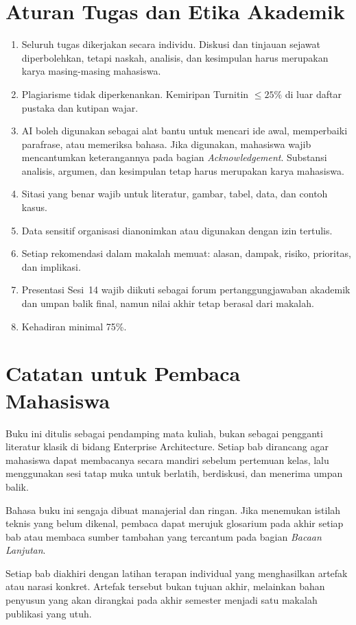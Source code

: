 \section{Aturan Tugas dan Etika Akademik}

\begin{enumerate}
    \item Seluruh tugas dikerjakan secara individu. Diskusi dan tinjauan
    sejawat diperbolehkan, tetapi naskah, analisis, dan kesimpulan harus
    merupakan karya masing-masing mahasiswa.
    \item Plagiarisme tidak diperkenankan. Kemiripan Turnitin $\leq 25\%$ di
    luar daftar pustaka dan kutipan wajar.
    \item AI boleh digunakan sebagai alat bantu untuk mencari ide awal,
    memperbaiki parafrase, atau memeriksa bahasa. Jika digunakan, mahasiswa
    wajib mencantumkan keterangannya pada bagian \emph{Acknowledgement}.
    Substansi analisis, argumen, dan kesimpulan tetap harus merupakan karya
    mahasiswa.
    \item Sitasi yang benar wajib untuk literatur, gambar, tabel, data, dan
    contoh kasus.
    \item Data sensitif organisasi dianonimkan atau digunakan dengan izin
    tertulis.
    \item Setiap rekomendasi dalam makalah memuat: alasan, dampak, risiko,
    prioritas, dan implikasi.
    \item Presentasi Sesi~14 wajib diikuti sebagai forum pertanggungjawaban
    akademik dan umpan balik final, namun nilai akhir tetap berasal dari
    makalah.
    \item Kehadiran minimal 75\%.
\end{enumerate}

\section{Catatan untuk Pembaca Mahasiswa}

Buku ini ditulis sebagai pendamping mata kuliah, bukan sebagai pengganti
literatur klasik di bidang Enterprise Architecture. Setiap bab dirancang agar
mahasiswa dapat membacanya secara mandiri sebelum pertemuan kelas, lalu
menggunakan sesi tatap muka untuk berlatih, berdiskusi, dan menerima umpan
balik.

Bahasa buku ini sengaja dibuat manajerial dan ringan. Jika menemukan istilah
teknis yang belum dikenal, pembaca dapat merujuk glosarium pada akhir setiap
bab atau membaca sumber tambahan yang tercantum pada bagian \emph{Bacaan
Lanjutan}.

Setiap bab diakhiri dengan latihan terapan individual yang menghasilkan
artefak atau narasi konkret. Artefak tersebut bukan tujuan akhir, melainkan
bahan penyusun yang akan dirangkai pada akhir semester menjadi satu makalah
publikasi yang utuh.
